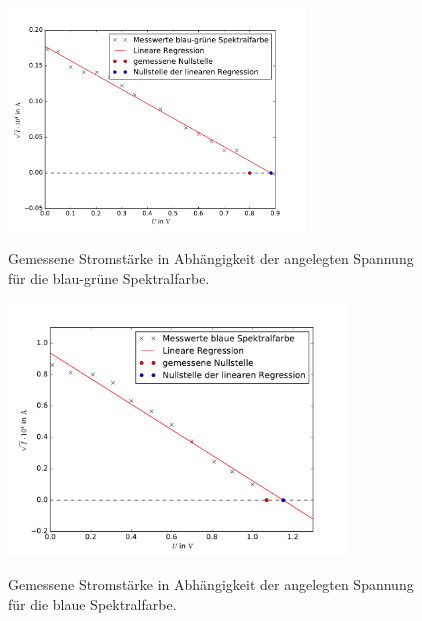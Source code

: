 \begin{figure}
  \centering
  \includegraphics[width = 0.7\textwidth]{Pics/blau_gruene_Spektrallinie.pdf}\\[0cm]
  \caption{Gemessene Stromstärke in Abhängigkeit der angelegten Spannung für die
           blau-grüne Spektralfarbe.}
  \label{fig:BlauGruen}
\end{figure}

\newpage



\begin{figure}
  \centering
  \includegraphics[width = 0.8\textwidth]{Pics/blaue_Spektrallinie.pdf}\\[0cm]
  \caption{Gemessene Stromstärke in Abhängigkeit der angelegten Spannung für die
           blaue Spektralfarbe.}
  \label{fig:Blau}
\end{figure}

\newpage



